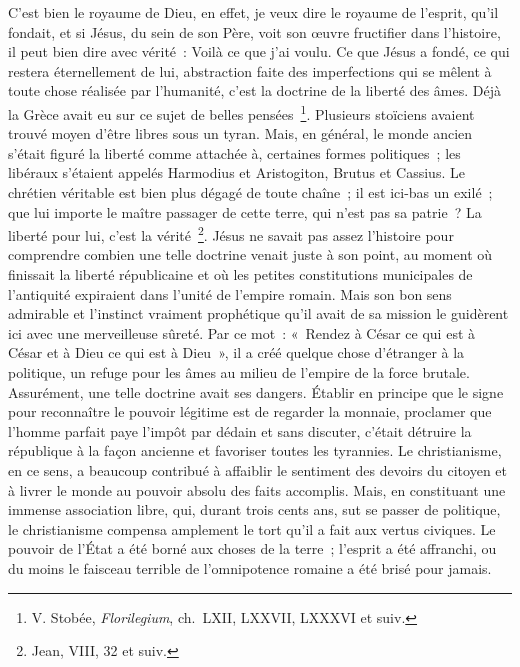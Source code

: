\documentclass[french,twoside]{book} %
\begin{document}
C’est bien le royaume de Dieu, en effet, je veux dire le royaume de l’esprit, qu’il fondait, et si Jésus, du sein de son Père, voit son œuvre fructifier dans l’histoire, il peut bien dire avec vérité : Voilà ce que j’ai voulu. Ce que Jésus a fondé, ce qui restera éternellement de lui, abstraction faite des imperfections qui se mêlent à toute chose réalisée par l’humanité, c’est la doctrine de la liberté des âmes. Déjà la Grèce avait eu sur ce sujet de belles pensées \footnote{ V. Stobée, {\itshape Florilegium}, ch. LXII, LXXVII, LXXXVI et suiv.}. Plusieurs stoïciens avaient trouvé moyen d’être libres sous un tyran. Mais, en général, le monde ancien s’était figuré la liberté comme attachée à, certaines formes politiques ; les libéraux s’étaient appelés Harmodius et Aristogiton, Brutus et Cassius. Le chrétien véritable est bien plus dégagé de toute chaîne ; il est ici-bas un exilé ; que lui importe le maître passager de cette terre, qui n’est pas sa patrie ? La liberté pour lui, c’est la vérité \footnote{Jean, VIII, 32 et suiv.}. Jésus ne savait pas assez l’histoire pour comprendre combien une telle doctrine venait juste à son point, au moment où finissait la liberté républicaine et où les petites constitutions municipales de l’antiquité expiraient dans l’unité de l’empire romain. Mais son bon sens admirable et l’instinct vraiment prophétique qu’il avait de sa mission le guidèrent ici avec une merveilleuse sûreté. Par ce mot : « Rendez à César ce qui est à César et à Dieu ce qui est à Dieu », il a créé quelque chose d’étranger à la politique, un refuge pour les âmes au milieu de l’empire de la force brutale. Assurément, une telle doctrine avait ses dangers. Établir en principe que le signe pour reconnaître le pouvoir légitime est de regarder la monnaie, proclamer que l’homme parfait paye l’impôt par dédain et sans discuter, c’était détruire la république à la façon ancienne et favoriser toutes les tyrannies. Le christianisme, en ce sens, a beaucoup contribué à affaiblir le sentiment des devoirs du citoyen et à livrer le monde au pouvoir absolu des faits accomplis. Mais, en constituant une immense association libre, qui, durant trois cents ans, sut se passer de politique, le christianisme compensa amplement le tort qu’il a fait aux vertus civiques. Le pouvoir de l’État a été borné aux choses de la terre ; l’esprit a été affranchi, ou du moins le faisceau terrible de l’omnipotence romaine a été brisé pour jamais.\par
\end{document}
